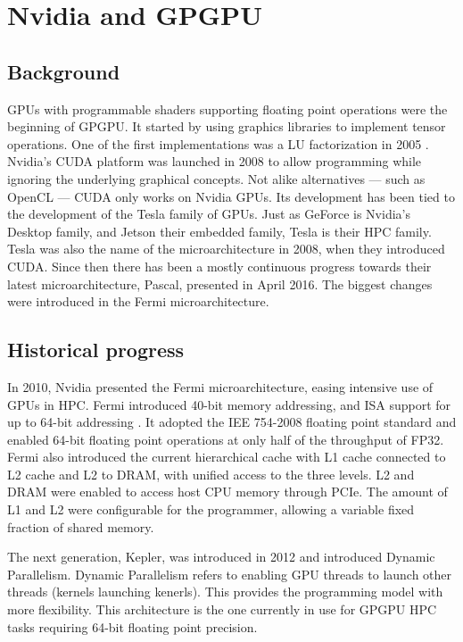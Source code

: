 
\section{Nvidia and GPGPU}

\subsection{Background}
GPUs with programmable shaders supporting floating point operations were the beginning of GPGPU.
It started by using graphics libraries to implement tensor operations.
One of the first implementations was a LU factorization in 2005 \cite{du2012cuda}.
Nvidia's CUDA platform was launched in 2008 to allow programming while ignoring the underlying graphical concepts.
Not alike alternatives --- such as OpenCL --- CUDA only works on Nvidia GPUs.
Its development has been tied to the development of the Tesla family of GPUs.
Just as GeForce is Nvidia's Desktop family, and Jetson their embedded family, Tesla is their HPC family.
Tesla was also the name of the microarchitecture in 2008, when they introduced CUDA.
Since then there has been a mostly continuous progress towards their latest microarchitecture, Pascal, presented in April 2016.
The biggest changes were introduced in the Fermi microarchitecture.

\subsection{Historical progress}
In 2010, Nvidia presented the Fermi microarchitecture, easing intensive use of GPUs in HPC.
Fermi introduced 40-bit memory addressing, and ISA support for up to 64-bit addressing \cite{nickolls2010gpu}.
It adopted the IEE 754-2008 floating point standard and enabled 64-bit floating point operations at only half of the throughput of FP32.
Fermi also introduced the current hierarchical cache with L1 cache connected to L2 cache and L2 to DRAM, with unified access to the three levels.
L2 and DRAM were enabled to access host CPU memory through PCIe.
The amount of L1 and L2 were configurable for the programmer, allowing a variable fixed fraction of shared memory.

The next generation, Kepler, was introduced in 2012 and introduced Dynamic Parallelism.
Dynamic Parallelism refers to enabling GPU threads to launch other threads (kernels launching kenerls).
This provides the programming model with more flexibility.
This architecture is the one currently in use for GPGPU HPC tasks requiring 64-bit floating point precision.

